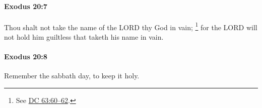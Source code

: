 		\paragraph{Exodus 20:7} %
			\label{EXODUS-20-7}

			Thou shalt not take the name of the LORD thy God in vain;%
				\footnote{%
					See \hyperref[DC63-60]{DC 63:60--62}.
					}
			for the LORD will not hold him guiltless that taketh his name in vain.


		\paragraph{Exodus 20:8} %
			\label{EXODUS-20-8}

			Remember the sabbath day, to keep it holy.


